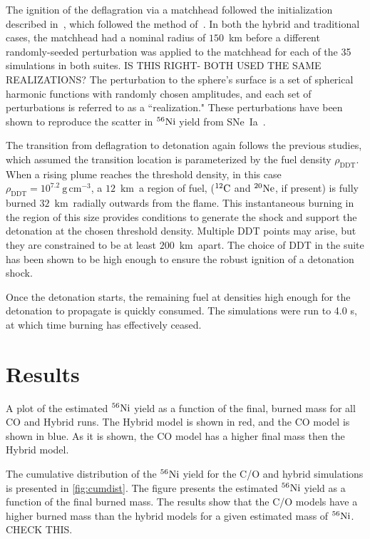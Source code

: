 \documentclass[iop,apj]{emulateapj}
\newcommand{\SNeIa}{SNe~Ia}
\newcommand{\C}[1]{\ensuremath{{}^{#1}{\rm C}}}
\newcommand{\Ne}[1]{\ensuremath{{}^{#1}{\rm Ne}}}
\newcommand{\Ni}[1]{\ensuremath{{}^{#1}{\rm Ni}}}
\newcommand{\unitspace}{\ensuremath{\,}}
\newcommand{\usp}{\unitspace}
\newcommand{\unitstyle}[1]{\ensuremath{\mathrm{#1}}}
\newcommand{\power}[2]{\ensuremath{{#1}^{#2}}}
\newcommand{\centi}{\unitstyle{c}}
\newcommand{\kilo}{\unitstyle{k}}
\newcommand{\meter}{\unitstyle{m}}
\newcommand{\cm}{\centi\meter}
\newcommand{\gram}{\unitstyle{g}}
\newcommand{\grampercc}{\gram\usp\power{\cm}{-3}} %
\newcommand{\km}{\kilo\meter}   %
\begin{document}
The ignition of the deflagration via a matchhead followed the 
initialization described in~\citet{kruegetal12}, which
followed the method of~\citet{townetal2009}.
In both the hybrid and traditional cases, the matchhead had a 
nominal radius of $150$~km before 
a different randomly-seeded perturbation was applied to the 
matchhead for each of the 35 simulations in both suites. {\color{red}
IS THIS RIGHT- BOTH USED THE SAME REALIZATIONS?}
The perturbation to the sphere's surface is a set of
spherical harmonic functions with randomly chosen amplitudes, and
each set of perturbations is referred to as a ``realization." 
These perturbations have been shown to reproduce 
the scatter in \Ni{56} 
yield from \SNeIa\ \citet{townetal2009}.


The transition from deflagration to detonation again follows
the previous studies, which assumed the transition location
is parameterized by the fuel density $\rho_{\mathrm{DDT}}$.
When a rising
plume reaches the threshold density, in this case
$\rho_{\mathrm{DDT}} = 10^{7.2}~\grampercc$, 
a $12$~\km\ a region of fuel, (\C{12} and \Ne{20}, if present) is
fully burned $32$~\km\ radially outwards from the flame. This
instantaneous burning in the region of this size provides conditions
to generate the shock and support the detonation at the chosen
threshold density.  Multiple DDT points may arise, but they are
constrained to be at least $200$~\km\ apart. The choice of DDT
in the suite has been shown to be high enough to ensure 
the robust ignition of a detonation shock.

Once the detonation starts, the remaining fuel at densities
high enough for the detonation to propagate is quickly consumed.
The simulations were run to 4.0 s, at which time burning 
has effectively ceased. 


\section{Results}

A plot of the estimated \Ni{56} yield as a function of the final, burned mass
for all CO and Hybrid runs. The Hybrid model is shown in red, and the CO
model is shown in blue. As it is shown, the CO model has a higher final mass
then the Hybrid model. 

The cumulative distribution of the \Ni{56} yield for the C/O and hybrid
simulations is presented in \ref{fig:cumdist}. 
The figure presents the estimated \Ni{56} yield as a function of the final burned 
mass. The results show that the C/O models have a higher burned mass than the
hybrid models for a given estimated mass of \Ni{56}. CHECK THIS.  
\end{document}
